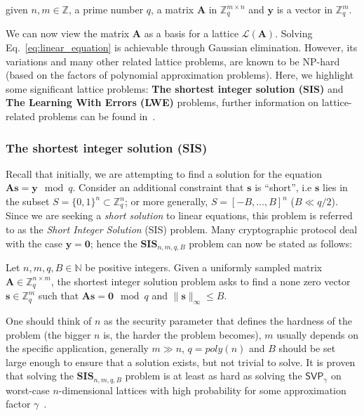 \documentclass[cryptography,review,submit,pdftex,moreauthors,amsmath,amssymb,aps,strict]{Definitions/mdpi}
\begin{document}
given $n,m \in \mathbb{Z}$, a prime number $q$, a matrix $\mathbf{A}$ in $\mathbb{Z}^{m\times n}_q$ and $\mathbf{y}$ is a vector in $\mathbb{Z}^m_q$. 

We can now view the matrix $\mathbf{A}$ as a basis for a lattice $\mathcal{L}(\mathbf{A})$. Solving Eq.~\eqref{eq:linear_equation} is achievable through Gaussian elimination. However, its variations and many other related lattice problems, are known to be NP-hard (based on the factors of polynomial approximation problems). Here, we highlight some significant lattice problems: \textbf{The shortest integer solution (SIS)} and \textbf{The Learning With Errors (LWE)} problems, further information on lattice-related problems can be found in~\cite{Pei16}.

\subsubsection{The shortest integer solution (SIS)}

Recall that initially, we are attempting to find a solution for the equation $\mathbf{A}\mathbf{s} = \mathbf{y} \mod q$. Consider an additional constraint that $\mathbf{s}$ is ``short'', i.e $\mathbf{s}$ lies in the subset $S=\{0,1\}^n\subset\mathbb{Z}^n_q$; or more generally, $S=[-B,\dots, B]^n$  ($B\ll q/2$). Since we are seeking a \textit{short solution} to linear equations, this problem is referred to as the \textit{Short Integer Solution} (SIS) problem. Many cryptographic protocol deal with the case $\mathbf{y}=\mathbf{0}$; hence the $\mathbf{SIS}_{n,m,q,B}$ problem can now be stated as follows:

\begin{Definition}
    Let $n,m,q, B \in \mathbb{N}$ be positive integers. Given a uniformly sampled matrix $\mathbf{A}\in\mathbb{Z}^{n\times m}_q$, the shortest integer solution problem asks to find a none zero vector $\mathbf{s}\in\mathbb{Z}^m_q$ such that $\mathbf{A}\mathbf{s}=\mathbf{0}\mod q$ and $\|\mathbf{s}\|_{\infty}\leq B$.
\end{Definition}

One should think of $n$ as the security parameter that defines the hardness of the problem (the bigger $n$ is, the harder the problem becomes), $m$ usually depends on the specific application, generally $m\gg n$, $q=poly(n)$ and $B$ should be set large enough to ensure that a solution exists, but not trivial to solve. It is proven that solving the $\mathbf{SIS}_{n,m,q, B}$ problem is at least as hard as solving the $\mathsf{SVP}_{\gamma}$ on worst-case $n$-dimensional lattices with high probability for some approximation factor $\gamma$~\cite{Pei16}.
\end{document}
